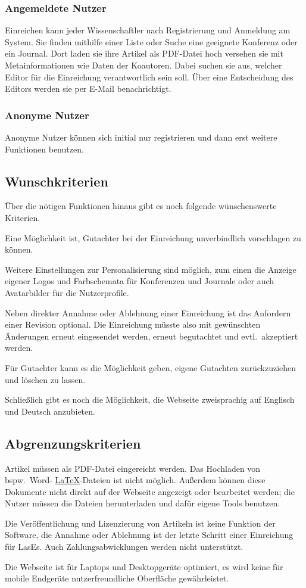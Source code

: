 \subsubsection{Angemeldete Nutzer}\label{mkrit:angemeldet}
Einreichen kann jeder Wissenschaftler nach Registrierung und Anmeldung am System.
Sie finden mithilfe einer Liste oder Suche eine geeignete Konferenz oder ein Journal.
Dort laden sie ihre Artikel als PDF-Datei hoch versehen sie mit Metainformationen wie Daten der Koautoren.
Dabei suchen sie aus, welcher Editor für die Einreichung verantwortlich sein soll.
Über eine Entscheidung des Editors werden sie per E-Mail benachrichtigt.

\subsubsection{Anonyme Nutzer}\label{mkrit:anon}
Anonyme Nutzer können sich initial nur registrieren und dann erst weitere Funktionen benutzen.


\subsection{Wunschkriterien}

Über die nötigen Funktionen hinaus gibt es noch folgende wünschenswerte Kriterien.

Eine Möglichkeit ist, Gutachter bei der Einreichung unverbindlich vorschlagen zu können.

Weitere Einstellungen zur Personalisierung sind möglich,
zum einen die Anzeige eigener Logos und Farbschemata für Konferenzen und Journale oder auch Avatarbilder für die Nutzerprofile.

Neben direkter Annahme oder Ablehnung einer Einreichung ist das Anfordern einer Revision optional.
Die Einreichung müsste also mit gewünschten Änderungen erneut eingesendet werden, erneut begutachtet und evtl.\ akzeptiert werden.

Für Gutachter kann es die Möglichkeit geben, eigene Gutachten zurückzuziehen und löschen zu lassen.

Schließlich gibt es noch die Möglichkeit, die Webseite zweisprachig auf Englisch und Deutsch anzubieten.

\subsection{Abgrenzungskriterien}

Artikel müssen als PDF-Datei eingereicht werden. Das Hochladen von bspw.\ Word- \hyperref[glo:latex]{\LaTeX}-Dateien ist nicht möglich.
Außerdem können diese Dokumente nicht direkt auf der Webseite angezeigt oder bearbeitet werden;
die Nutzer müssen die Dateien herunterladen und dafür eigene Tools benutzen.

Die Veröffentlichung und Lizenzierung von Artikeln ist keine Funktion der Software,
die Annahme oder Ablehnung ist der letzte Schritt einer Einreichung für LasEs.
Auch Zahlungsabwicklungen werden nicht unterstützt.

Die Webseite ist für Laptops und Desktopgeräte optimiert, es wird keine für mobile Endgeräte nutzerfreundliche Oberfläche gewährleistet.
